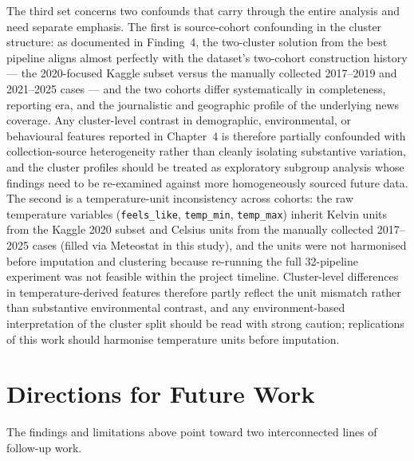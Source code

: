The third set concerns two confounds that carry through the entire analysis and need separate emphasis. \label{lim:source_cohort}The first is source-cohort confounding in the cluster structure: as documented in Finding~4, the two-cluster solution from the best pipeline aligns almost perfectly with the dataset's two-cohort construction history --- the 2020-focused Kaggle subset versus the manually collected 2017--2019 and 2021--2025 cases --- and the two cohorts differ systematically in completeness, reporting era, and the journalistic and geographic profile of the underlying news coverage. Any cluster-level contrast in demographic, environmental, or behavioural features reported in Chapter~4 is therefore partially confounded with collection-source heterogeneity rather than cleanly isolating substantive variation, and the cluster profiles should be treated as exploratory subgroup analysis whose findings need to be re-examined against more homogeneously sourced future data. \label{lim:temp_units}The second is a temperature-unit inconsistency across cohorts: the raw temperature variables (\texttt{feels\_like}, \texttt{temp\_min}, \texttt{temp\_max}) inherit Kelvin units from the Kaggle 2020 subset and Celsius units from the manually collected 2017--2025 cases (filled via Meteostat in this study), and the units were not harmonised before imputation and clustering because re-running the full 32-pipeline experiment was not feasible within the project timeline. Cluster-level differences in temperature-derived features therefore partly reflect the unit mismatch rather than substantive environmental contrast, and any environment-based interpretation of the cluster split should be read with strong caution; replications of this work should harmonise temperature units before imputation.

\section{Directions for Future Work}

The findings and limitations above point toward two interconnected lines of follow-up work.

